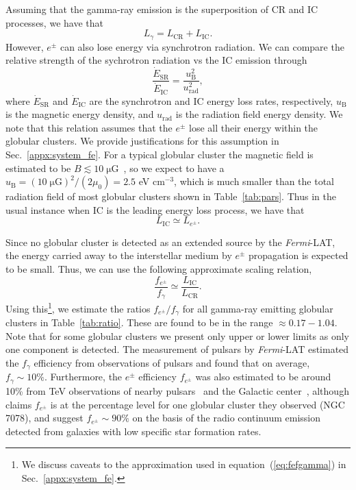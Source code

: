 \documentclass[doublespace,nopageskip]{VTthesis}
\begin{document}
Assuming that the gamma-ray emission is the superposition of CR and IC processes, we have that
\begin{equation}
    L_\gamma = L_\mathrm{CR} + L_\mathrm{IC}.
\end{equation}
However, $e^\pm$ can also lose energy via synchrotron radiation. We can compare the relative strength of the sychrotron radiation vs the IC emission through
\begin{equation}
    \frac{\dot{E}_\mathrm{SR}}{\dot{E}_\mathrm{IC}} = \frac{u_\mathrm{B}^2}{u_\mathrm{rad}^2},
\end{equation}
where $\dot{E}_\mathrm{SR}$ and $\dot{E}_\mathrm{IC}$ are the synchrotron and IC energy loss rates, respectively, $u_\mathrm{B}$ is the magnetic energy density, and $u_\mathrm{rad}$ is the radiation field energy density. We note that this relation assumes that the $e^\pm$ lose all their energy within the globular clusters. We provide justifications for this assumption in Sec.~\ref{appx:system_fe}. For a typical globular cluster the magnetic field is estimated to be $B\lesssim \mathrm{10\;\mu G}$~\citep{2007MNRAS.377..920B}, so we expect to have a $u_\mathrm{B} = {\mathrm{(10\;\mu G)}^2}/{(2\mu_0)} = 2.5$ eV cm$^{-3}$, which is much smaller than the total radiation field of most globular clusters shown in Table~\ref{tab:pars}. Thus in the usual instance when IC is the leading energy loss process, we have that
\begin{equation}
    L_\mathrm{IC} \simeq L_{e^\pm}.
\end{equation}

Since no globular cluster is detected as an extended source by the \textit{Fermi}-LAT, the energy carried away to the interstellar medium by $e^\pm$ propagation is expected to be small. Thus, we can use the following approximate scaling relation,
\begin{equation}\label{eq:fefgamma}
    \dfrac{f_{e^\pm}}{f_\gamma} \simeq \dfrac{L_\mathrm{IC}}{L_\mathrm{CR}}.
\end{equation}
Using this\footnote{We discuss caveats to the approximation used in equation~(\ref{eq:fefgamma}) in Sec.~\ref{appx:system_fe}.}, we estimate the ratios $f_{e^\pm}/f_\gamma$ for all gamma-ray emitting globular clusters in Table~\ref{tab:ratio}. These are found to be in the range $\approx 0.17 - 1.04$. Note that for some globular clusters we present only upper or lower limits as only one component is detected. The measurement of pulsars by \textit{Fermi}-LAT estimated the $f_{\gamma}$ efficiency from observations of pulsars and found that on average, $f_\gamma \sim \mathrm{10\%}$. Furthermore, the $e^\pm$ efficiency $f_{e^\pm}$ was also estimated to be around 10\% from TeV observations of {nearby pulsars~\citep{2017PhRvD..96j3013H, 2018PhRvD..98d3005H, 2021arXiv210400014H} and} the Galactic center~\citep{2013MNRAS.435L..14B}, although \citet{2019MNRAS.484.2876M} claims $f_{e^\pm}$ is at the percentage level for one globular cluster they observed (NGC 7078), and \citet{2020arXiv200508982S} suggest $f_{e^\pm} \sim 90\%$ on the basis of the  radio continuum emission detected from galaxies with low specific star formation rates.
\end{document}
